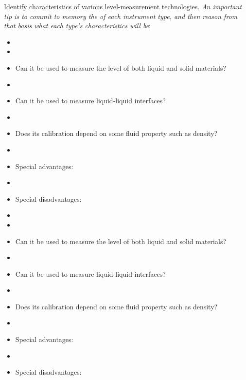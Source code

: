 

Identify characteristics of various level-measurement technologies.  {\it An important tip is to commit to memory the  of each instrument type, and then reason from that basis what each type's characteristics will be}:

\vskip 10pt

\begin{itemize}
\goodbreak
\item{} 
\item\item{} Can it be used to measure the level of both liquid and solid materials?
\item\item{} Can it be used to measure liquid-liquid interfaces?
\item\item{} Does its calibration depend on some fluid property such as density?
\item\item{} Special advantages:
\item\item{} Special disadvantages:
\end{itemize}

\vskip 10pt

\begin{itemize}
\goodbreak
\item{} 
\item\item{} Can it be used to measure the level of both liquid and solid materials?
\item\item{} Can it be used to measure liquid-liquid interfaces?
\item\item{} Does its calibration depend on some fluid property such as density?
\item\item{} Special advantages:
\item\item{} Special disadvantages:
\end{itemize}

\vskip 10pt


